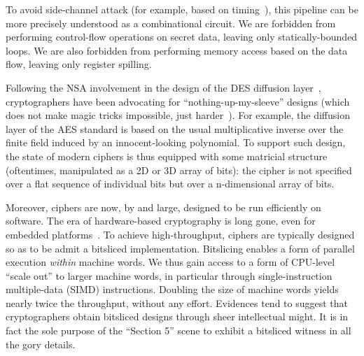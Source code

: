 \documentclass[draft,english]{jflart}
\begin{document}

To avoid side-channel attack (for example, based on
timing~\citep{time-side-channel}), this pipeline can be more precisely
understood as a combinational circuit. We are forbidden from
performing control-flow operations on secret data, leaving only
statically-bounded loops. We are also forbidden from performing memory
access based on the data flow, leaving only register spilling.


Following the NSA involvement in the design of the DES diffusion
layer~\citep{des-history}, cryptographers have been advocating for
``nothing-up-my-sleeve'' designs (which does not make magic tricks
impossible, just harder~\citep{bernstein:something-up-my-sleeves}).
For example, the diffusion layer of the AES standard is based on the
usual multiplicative inverse over the finite field induced by an
innocent-looking polynomial. To support such design, the state of
modern ciphers is thus equipped with some matricial structure
(oftentimes, manipulated as a 2D or 3D array of bits): the cipher is
not specified over a flat sequence of individual bits but over a
n-dimensional array of bits.


Moreover, ciphers are now, by and large, designed to be run
efficiently on software. The era of hardware-based cryptography is
long gone, even for embedded platforms~\citep{lightweight-crypto}. To
achieve high-throughput, ciphers are typically designed so as to be
admit a bitsliced implementation. Bitslicing enables a form of
parallel execution \emph{within} machine words. We thus gain access to
a form of CPU-level ``scale out'' to larger machine words, in
particular through single-instruction multiple-data (SIMD)
instructions. Doubling the size of machine words yields nearly twice
the throughput, without any effort. Evidences tend to suggest that
cryptographers obtain bitsliced designs through sheer intellectual
might. It is in fact the sole purpose of the ``Section 5'' scene to
exhibit a bitsliced witness in all the gory details.
\end{document}
